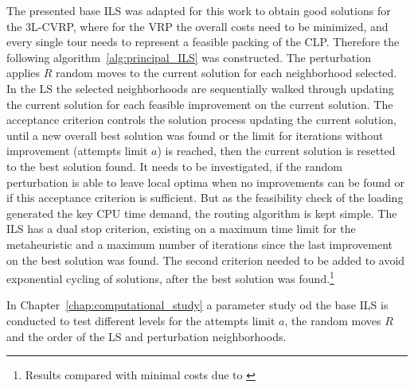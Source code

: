 The presented base \gls{ILS} was adapted for this work to obtain good solutions for the \gls{3L-CVRP}, where for the \gls{VRP}
the overall costs need to be minimized, and every single tour needs to represent a feasible packing of the \gls{CLP}.
Therefore the following algorithm~\ref{alg:principal_ILS} was constructed. The perturbation applies $R$ random moves
to the current solution for each  neighborhood selected. In the \gls{LS}
the selected neighborhoods are sequentially walked through updating the current solution for each feasible improvement on
the current solution. The acceptance criterion controls the solution process updating the current solution, until a new overall
best solution was found or the limit for iterations without improvement (attempts limit $a$) is reached, then the current solution is resetted
to the best solution found. It needs to be investigated, if the random perturbation is able to leave local optima
when no improvements can be found or if this acceptance criterion is sufficient. But as the feasibility check of the loading
generated the key CPU time demand, the routing algorithm is kept simple. The \gls{ILS} has a dual stop criterion, existing on a maximum time limit for the metaheuristic and a maximum number of
iterations since the last improvement on the best solution was found. The second criterion needed to be added
to avoid exponential cycling of solutions, after the best solution was found.\footnote{Results compared with
    minimal costs due to \cite{tamke_branch-and-cut_2024}}


\parbreak

In Chapter~\ref{chap:computational_study} a parameter study od the base \gls{ILS} is conducted to test different
levels for the attempts limit $a$, the random moves $R$ and the order of the \gls{LS} and perturbation neighborhoods.

